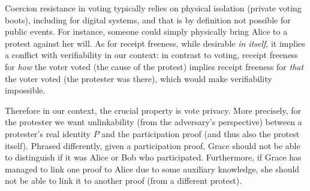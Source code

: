 Coercion resistance in voting typically relies on physical isolation
(\eg private voting boots), including for digital systems, 
and that is by definition not possible for public events.
For instance, someone could simply physically bring Alice to a protest against her will.
As for receipt freeness, while
desirable \emph{in itself}, it implies a conflict with verifiability in our context:
in contrast to voting, receipt freeness for \emph{how} the voter voted (\ie the 
cause of the protest) implies receipt freeness for \emph{that} the voter voted 
(\ie the protester was there), which would make verifiability impossible.

Therefore in our context, the crucial property is  vote privacy.
More precisely, for the protester we want unlinkability (from the adversary's 
perspective) between a protester's real identity \(P\) and the participation 
proof (and thus also the protest itself).
Phrased differently, given a participation proof, Grace should not be able to 
distinguish if it was Alice or Bob who participated.
Furthermore, if Grace has managed to link one proof to Alice due to some 
auxiliary knowledge, she should not be able to link it to another proof (from a different protest).



